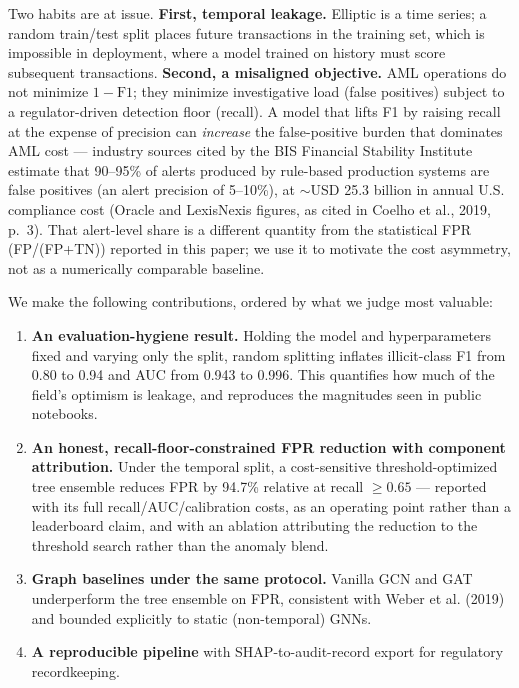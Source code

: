 \documentclass[11pt]{article}
\begin{document}
Two habits are at issue. \textbf{First, temporal leakage.} Elliptic is a time series; a random train/test split places future transactions in the training set, which is impossible in deployment, where a model trained on history must score subsequent transactions. \textbf{Second, a misaligned objective.} AML operations do not minimize $1 - \text{F1}$; they minimize investigative load (false positives) subject to a regulator-driven detection floor (recall). A model that lifts F1 by raising recall at the expense of precision can \emph{increase} the false-positive burden that dominates AML cost --- industry sources cited by the BIS Financial Stability Institute estimate that 90--95\% of alerts produced by rule-based production systems are false positives (an alert precision of 5--10\%), at $\sim$USD 25.3 billion in annual U.S. compliance cost (Oracle and LexisNexis figures, as cited in Coelho et al., 2019, p.~3). That alert-level share is a different quantity from the statistical FPR (FP/(FP+TN)) reported in this paper; we use it to motivate the cost asymmetry, not as a numerically comparable baseline.

We make the following contributions, ordered by what we judge most valuable:

\begin{enumerate}[leftmargin=1.4em]
  \item \textbf{An evaluation-hygiene result.} Holding the model and hyperparameters fixed and varying only the split, random splitting inflates illicit-class F1 from 0.80 to 0.94 and AUC from 0.943 to 0.996. This quantifies how much of the field's optimism is leakage, and reproduces the magnitudes seen in public notebooks.
  \item \textbf{An honest, recall-floor-constrained FPR reduction with component attribution.} Under the temporal split, a cost-sensitive threshold-optimized tree ensemble reduces FPR by 94.7\% relative at recall $\geq 0.65$ --- reported with its full recall/AUC/calibration costs, as an operating point rather than a leaderboard claim, and with an ablation attributing the reduction to the threshold search rather than the anomaly blend.
  \item \textbf{Graph baselines under the same protocol.} Vanilla GCN and GAT underperform the tree ensemble on FPR, consistent with Weber et al. (2019) and bounded explicitly to static (non-temporal) GNNs.
  \item \textbf{A reproducible pipeline} with SHAP-to-audit-record export for regulatory recordkeeping.
\end{enumerate}
\end{document}
